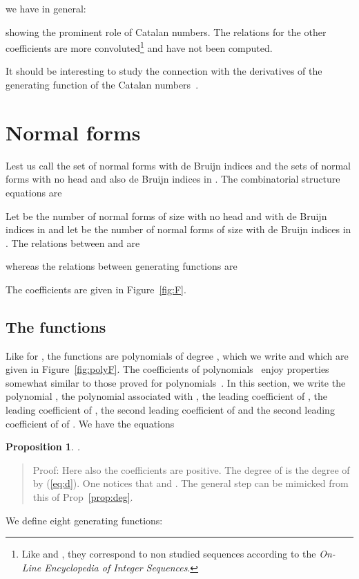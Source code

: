 \documentclass[preprint,authoryear]{elsarticle}
\newenvironment{proof}[1]{\begin{quotation}\noindent\textsf{Proof:} #1}{\end{quotation}}
\newtheorem{prop}{Proposition}
\begin{document}
we have in general:
  
showing the prominent role of Catalan numbers.  The relations for the other coefficients
are more convoluted\footnote{Like  and , they correspond to non
  studied sequences according to the \emph{On-Line Encyclopedia of Integer Sequences}.}
and have not been computed.

It should be interesting to study the connection with the derivatives of the generating
function  of the Catalan numbers~\cite{lang02:_polyn_cataly}. 
\section{Normal forms}
\label{sec:normal-forms}

Lest us call  the set of normal forms with  de Bruijn indices and  the sets
of normal forms with no head  and also  de Bruijn indices in .  The combinatorial structure equations are

Let  be the number of normal forms of size  with no head  and with de
Bruijn indices in  and let  be the number of normal forms of size 
with de Bruijn indices in .  The relations between  and 
are

whereas the relations between generating functions are

The coefficients  are given in Figure~\ref{fig:F}.  

\subsection*{The functions }
Like for , the functions  are polynomials of degree , which we write  and which are given in Figure~\ref{fig:polyF}.  The
coefficients of polynomials~ enjoy properties somewhat similar to those proved
for polynomials~.  In this section, we write  the polynomial ,
 the polynomial associated with ,  the leading coefficient of ,
 the leading coefficient of ,  the second leading coefficient of
 and  the second leading coefficient of of .  We have the equations

\begin{prop}\label{propNF:deg}
.
\end{prop}
\begin{proof}{}
Here also the coefficients are positive.  The degree of  is the degree of  by
(\ref{eq:d}). One notices that  and .  The
general step can be mimicked from this of Prop~\ref{prop:deg}.
\end{proof}
We define eight generating
functions:
\end{document}
